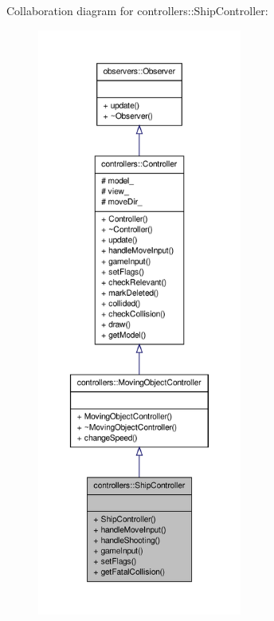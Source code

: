 \-Collaboration diagram for controllers\-:\-:\-Ship\-Controller\-:\nopagebreak
\begin{figure}[H]
\begin{center}
\leavevmode
\includegraphics[height=550pt]{d7/dc1/classcontrollers_1_1ShipController__coll__graph}
\end{center}
\end{figure}
